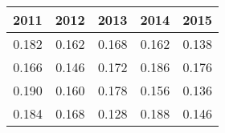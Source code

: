 \begin{tabular}{rrrrr}
\toprule
2011 & 2012 & 2013 & 2014 & 2015 \\
\midrule
0.182 & 0.162 & 0.168 & 0.162 & 0.138 \\
0.166 & 0.146 & 0.172 & 0.186 & 0.176 \\
0.190 & 0.160 & 0.178 & 0.156 & 0.136 \\
0.184 & 0.168 & 0.128 & 0.188 & 0.146 \\
\bottomrule
\end{tabular}
